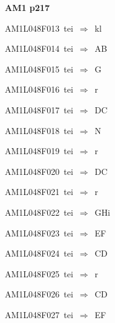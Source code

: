 \par\vfill\eject
{\bf\hfill AM1 p217\hfill\hbox{}}\par\bigskip
{\sixrm AM1L048F013\ {\sixit tei}\ }$\Rightarrow$\ {\tenit kl}\par\smallskip
{\sixrm AM1L048F014\ {\sixit tei}\ }$\Rightarrow$\ AB\par\smallskip
{\sixrm AM1L048F015\ {\sixit tei}\ }$\Rightarrow$\ G\par\smallskip
{\sixrm AM1L048F016\ {\sixit tei}\ }$\Rightarrow$\ {\tenit r}\par\smallskip
{\sixrm AM1L048F017\ {\sixit tei}\ }$\Rightarrow$\ DC\par\smallskip
{\sixrm AM1L048F018\ {\sixit tei}\ }$\Rightarrow$\ N\par\smallskip
{\sixrm AM1L048F019\ {\sixit tei}\ }$\Rightarrow$\ {\tenit r}\par\smallskip
{\sixrm AM1L048F020\ {\sixit tei}\ }$\Rightarrow$\ DC\par\smallskip
{\sixrm AM1L048F021\ {\sixit tei}\ }$\Rightarrow$\ {\tenit r}\par\smallskip
{\sixrm AM1L048F022\ {\sixit tei}\ }$\Rightarrow$\ GH{\tenit i}\par\smallskip
{\sixrm AM1L048F023\ {\sixit tei}\ }$\Rightarrow$\ EF\par\smallskip
{\sixrm AM1L048F024\ {\sixit tei}\ }$\Rightarrow$\ CD\par\smallskip
{\sixrm AM1L048F025\ {\sixit tei}\ }$\Rightarrow$\ {\tenit r}\par\smallskip
{\sixrm AM1L048F026\ {\sixit tei}\ }$\Rightarrow$\ CD\par\smallskip
{\sixrm AM1L048F027\ {\sixit tei}\ }$\Rightarrow$\ EF\par\smallskip

